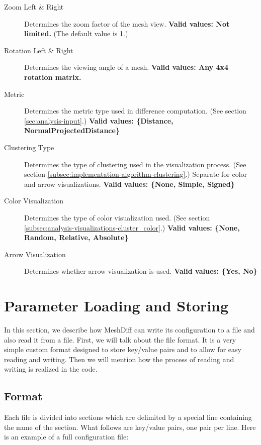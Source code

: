 \begin{description}
\item [Zoom Left \& Right] Determines the zoom factor of the mesh view. {\bf Valid values: Not limited.} (The default value is 1.)
\item [Rotation Left \& Right] Determines the viewing angle of a mesh. {\bf Valid values: Any 4x4 rotation matrix.}
\item [Metric] Determines the metric type used in difference computation. (See section \ref{sec:analysis-input}.) {\bf Valid values: \{Distance, NormalProjectedDistance\}}
\item [Clustering Type] Determines the type of clustering used in the visualization process. (See section \ref{subsec:implementation-algorithm-clustering}.) Separate for color and arrow visualizations. {\bf Valid values: \{None, Simple, Signed\}}
\item [Color Visualization] Determines the type of color visualization used. (See section \ref{subsec:analysis-visualizations-cluster_color}.) {\bf Valid values: \{None, Random, Relative, Absolute\}}
\item [Arrow Visualization] Determines whether arrow visualization is used. {\bf Valid values: \{Yes, No\}}
\end{description}

\section{Parameter Loading and Storing}
\label{attch:parameter_load_store}

In this section, we describe how MeshDiff can write its configuration to a file and also read it from a file. First, we will talk about the file format. It is a very simple custom format designed to store key/value pairs and to allow for easy reading and writing. Then we will mention how the process of reading and writing is realized in the code.

\subsection{Format}
\label{attch:parameter_load_store-format}

Each file is divided into sections which are delimited by a special line containing the name of the section. What follows are key/value pairs, one pair per line. Here is an example of a full configuration file:

